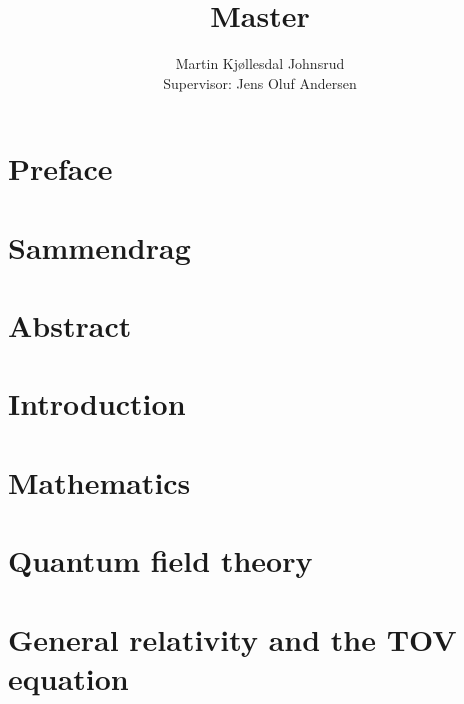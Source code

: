 \documentclass{book}
\title{\huge{Master}}
\author{
    \large{Martin Kjøllesdal Johnsrud}\\
    \normalsize{Supervisor: Jens Oluf Andersen}
    }
\begin{document}
    \frontmatter
    \maketitle

    \chapter{Preface}
    
    \chapter{Sammendrag}
    
    \chapter{Abstract}
    


    \listoftodos
    \clearpage
    \setcounter{tocdepth}{1}
    \tableofcontents
   
    \setlength{\parindent}{0em}
    \setlength{\parskip}{0.8em}

    \mainmatter

    \chapter{Introduction}
    \label{chapter: introduction}
    

    \chapter{Mathematics}
    \label{chapter: math}
    
    

    \chapter{Quantum field theory}
    \label{chapter: QFT}
    
    
    
    
    

    \chapter{General relativity and the TOV equation}
    \label{chapter: GR}
    
    
    
\end{document}

